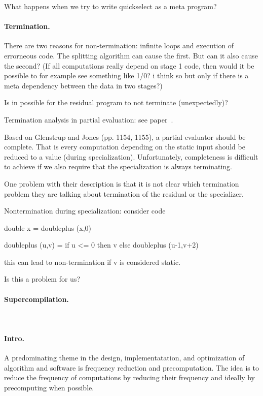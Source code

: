 What happens when we try to write quickselect as a meta program? 


\paragraph{Termination.}

There are two reasons for non-termination: infinite loops and
execution of errorneous code.  The splitting algorithm can cause the
first.  But can it also cause the second? (If all computations really
depend on stage 1 code, then would it be possible to for example see
something like 1/0?  i think so but only if there is a meta dependency
between the data in two stages?)


Is in possible for the residual program to not terminate (unexpectedly)? 

Termination analysis in partial evaluation: see paper~\cite{AH96,GJ05}.

Based on Glenstrup and Jones (pp. 1154, 1155), a partial evaluator
should be complete. That is every computation depending on the static
input should be reduced to a value (during specialization).
Unfortunately, completeness is difficult to achieve if we also require
that the specialization is always terminating.

One problem with their description is that it is not clear which
termination problem they are talking about termination of the residual
or the specializer. 

Nontermination during specialization: 
consider code

double x = doubleplus (x,0) 

doubleplus (u,v) = if u <= 0 then v else doubleplus (u-1,v+2)

this can lead to non-termination if v is considered static.  

Is this a problem for us? 



\paragraph{Supercompilation.}
~\cite{Turchin86}


\paragraph{Intro.}

A predominating theme in the design, implementatation, and
optimization of algorithm and software is frequency reduction and
precomputation.  The idea is to reduce the frequency of computations
by reducing their frequency and ideally by precomputing when possible.


